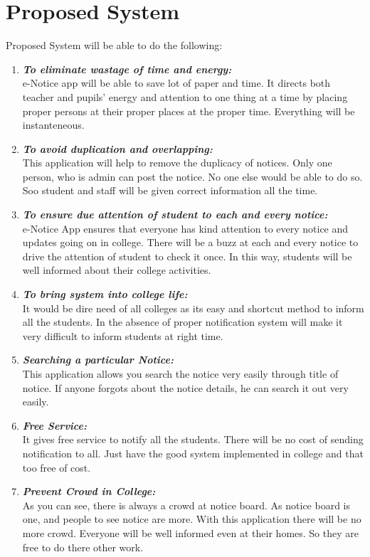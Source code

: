 \pagebreak
\section{Proposed System}
Proposed System will be able to do the following:
\begin{enumerate}
\item \textbf{\emph{To eliminate wastage of time and energy:}}\\
e-Notice app will be able to save lot of paper and time. It directs both teacher and pupils’ energy and attention to one
thing at a time by placing proper persons at their proper places at the proper time. Everything will be instanteneous.
\item \textbf{\emph{To avoid duplication and overlapping:}}\\
This application will help to remove the duplicacy of notices. Only one person, who is admin can post the notice.
No one else would be able to do so. Soo student and staff will be given correct information all the time.
\item \textbf{\emph{To ensure due attention of student to each and every notice:}}\\
e-Notice App ensures that everyone has kind attention to every notice and updates going on in college.
There will be a buzz at each and every notice to drive the attention of student to check it once.
In this way, students will be well informed about their college activities.
\item \textbf{\emph{To bring system into college life:}}\\ 
It would be dire need of all colleges as its easy and shortcut method to inform all the students. In the absence of proper notification system will make it very difficult to inform students at right time.
\item \textbf{\emph{Searching a particular Notice:}}\\
This application allows you search the notice very easily through title of notice. If anyone forgots about the
notice details, he can search it out very easily.

\item \textbf{\emph{Free Service:}}\\
It gives free service to notify all the students. There will be no cost of sending notification to all.
Just have the good system implemented in college and that too free of cost.

\item \textbf{\emph{Prevent Crowd in College:}}\\
As you can see, there is always a crowd at notice board. As notice board is one, and people to see notice are more.
With this application there will be no more crowd. Everyone will be well informed even at their homes. So they are
free to do there other work.


\end{enumerate}
